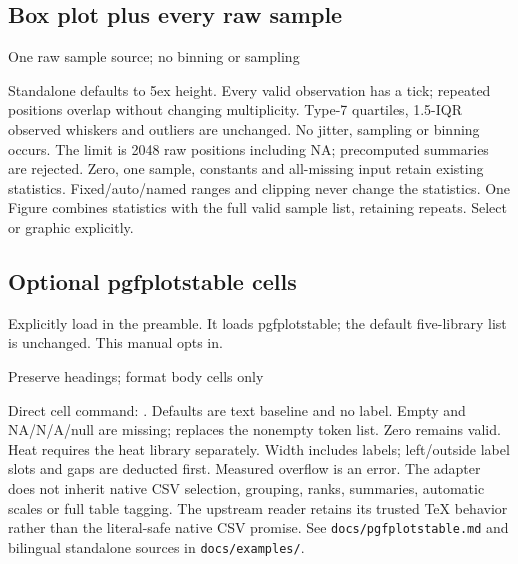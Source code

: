 \subsection{Box plot plus every raw sample}
\begin{demo}{One raw sample source; no binning or sampling}
\begin{gradtable}[style=rug-report,width=\linewidth]
\end{gradtable}
\end{demo}
Standalone  defaults to 5ex height. Every valid observation has a tick; repeated positions overlap without changing multiplicity. Type-7 quartiles, 1.5-IQR observed whiskers and outliers are unchanged. No jitter, sampling or binning occurs. The limit is 2048 raw positions including NA; precomputed summaries are rejected.
Zero, one sample, constants and all-missing input retain existing statistics. Fixed/auto/named ranges and clipping never change the statistics. One Figure combines statistics with the full valid sample list, retaining repeats. Select  or graphic  explicitly.
\clearpage
\subsection{Optional pgfplotstable cells}
Explicitly load  in the preamble. It loads pgfplotstable; the default five-library list is unchanged. This manual opts in.
\begin{demo}{Preserve headings; format body cells only}
\begingroup
{}
\endgroup
\end{demo}
Direct cell command: . Defaults are text baseline and no label. Empty and NA/N/A/null are missing;  replaces the nonempty token list. Zero remains valid. Heat requires the heat library separately. Width includes labels; left/outside label slots and gaps are deducted first. Measured overflow is an error.
The adapter does not inherit native CSV selection, grouping, ranks, summaries, automatic scales or full table tagging. The upstream reader retains its trusted TeX behavior rather than the literal-safe native CSV promise. See \texttt{docs/pgfplotstable.md} and bilingual standalone sources in \texttt{docs/examples/}.
